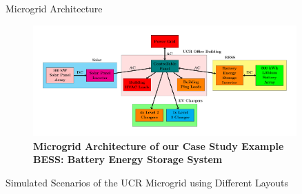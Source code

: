 \documentclass[final, 36 pt]{beamer}
\newlength{\sepwid}
\newlength{\onecolwid}
\newlength{\twocolwid}
\begin{document}
\begin{frame}[t]
\begin{columns}[t]
\begin{column}{\onecolwid}

\end{column} %

\begin{column}{\sepwid}\end{column} %

\begin{column}{\twocolwid} %


\begin{block}{Microgrid Architecture}
	\begin{figure}[!htb] 		
		\includegraphics[width=\linewidth]{Fig/power_system_setup_modelica_large}
		\caption{\large \bf{Microgrid Architecture of our Case Study Example BESS: Battery Energy Storage System}}
		\label{fig:powersystemsetupfull}
	\end{figure}
\end{block}

\begin{block}{Simulated Scenarios of the UCR Microgrid using Different Layouts}
	
	\begin{table}
		\caption{}
		\centering
		
		\label{tab:scenarios}
	\end{table}
	
\end{block}


\end{column}
\end{columns}
\end{frame}
\end{document}
